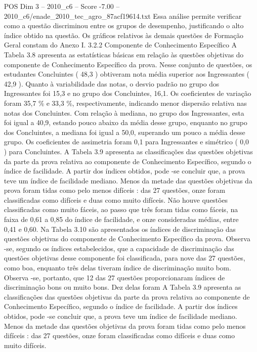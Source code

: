 \begin{textsample}{POS Dim 3 – 2010\_c6 – Score -7.00 – 2010\_c6/enade\_2010\_tec\_agro\_87acf19614.txt}
Essa análise permite verificar como a questão discriminou entre os grupos de desempenho, justificando o alto índice obtido na questão.
Os gráficos relativos às demais questões de Formação Geral constam do Anexo I. 3.2.2 Componente de Conhecimento Específico A Tabela 3.8 apresenta as estatísticas básicas em relação às questões objetivas do componente de Conhecimento Específico da prova.
Nesse conjunto de questões, os estudantes Concluintes ( 48,3 ) obtiveram nota média superior aos Ingressantes ( 42,9 ).
Quanto à variabilidade das notas, o desvio padrão no grupo dos Ingressantes foi 15,3 e no grupo dos Concluintes, 16,1.
Os coeficientes de variação foram 35,7 \% e 33,3 \%, respectivamente, indicando menor dispersão relativa nas notas dos Concluintes.
Com relação à mediana, no grupo dos Ingressantes, esta foi igual a 40,9, estando pouco abaixo da média desse grupo, enquanto no grupo dos Concluintes, a mediana foi igual a 50,0, superando um pouco a média desse grupo.
Os coeficientes de assimetria foram 0,1 para Ingressantes e simétrico ( 0,0 ) para Concluintes.
A Tabela 3.9 apresenta as classificações das questões objetivas da parte da prova relativa ao componente de Conhecimento Específico, segundo o índice de facilidade.
A partir dos índices obtidos, pode -se concluir que, a prova teve um índice de facilidade mediano.
Menos da metade das questões objetivas da prova foram tidas como pelo menos difíceis : das 27 questões, onze foram classificadas como difíceis e duas como muito difíceis.
Não houve questões classificadas como muito fáceis, ao passo que três foram tidas como fáceis, na faixa de 0,61 a 0,85 do índice de facilidade, e onze consideradas médias, entre 0,41 e 0,60.
Na Tabela 3.10 são apresentados os índices de discriminação das questões objetivas do componente de Conhecimento Específico da prova.
Observa -se, segundo os índices estabelecidos, que a capacidade de discriminação das questões objetivas desse componente foi classificada, para nove das 27 questões, como boa, enquanto três delas tiveram índice de discriminação muito bom.
Observa -se, portanto, que 12 das 27 questões proporcionaram índices de discriminação bons ou muito bons.
Dez delas foram A Tabela 3.9 apresenta as classificações das questões objetivas da parte da prova relativa ao componente de Conhecimento Específico, segundo o índice de facilidade.
A partir dos índices obtidos, pode -se concluir que, a prova teve um índice de facilidade mediano.
Menos da metade das questões objetivas da prova foram tidas como pelo menos difíceis : das 27 questões, onze foram classificadas como difíceis e duas como muito difíceis.

\end{textsample}
